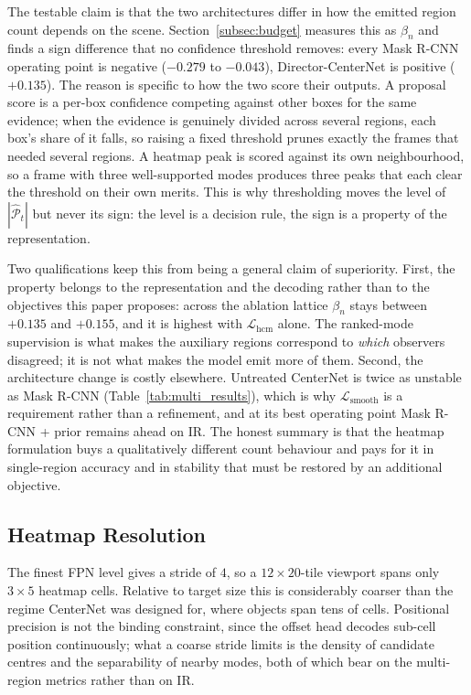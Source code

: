 \documentclass[preprint,12pt]{elsarticle}
\begin{document}
The testable claim is that the two architectures differ in how the emitted
region count depends on the scene. Section~\ref{subsec:budget} measures this as
$\beta_n$ and finds a sign difference that no confidence threshold removes:
every Mask R-CNN operating point is negative ($-0.279$ to $-0.043$),
Director-CenterNet is positive ($+0.135$). The reason is specific to how the
two score their outputs. A proposal score is a per-box confidence competing
against other boxes for the same evidence; when the evidence is genuinely
divided across several regions, each box's share of it falls, so raising a fixed
threshold prunes exactly the frames that needed several regions. A heatmap peak
is scored against its own neighbourhood, so a frame with three well-supported
modes produces three peaks that each clear the threshold on their own merits.
This is why thresholding moves the level of $|\hat{\mathcal{P}}_t|$ but never
its sign: the level is a decision rule, the sign is a property of the
representation.

Two qualifications keep this from being a general claim of superiority. First,
the property belongs to the representation and the decoding rather than to the
objectives this paper proposes: across the ablation lattice $\beta_n$ stays
between $+0.135$ and $+0.155$, and it is highest with
$\mathcal{L}_{\text{hcm}}$ alone. The ranked-mode supervision is what makes the
auxiliary regions correspond to \emph{which} observers disagreed; it is not
what makes the model emit more of them. Second, the architecture change is costly
elsewhere. Untreated CenterNet is twice as unstable as Mask R-CNN
(Table~\ref{tab:multi_results}), which is why $\mathcal{L}_{\text{smooth}}$ is
a requirement rather than a refinement, and at its best operating point
Mask R-CNN + prior remains ahead on IR. The honest summary is that the heatmap
formulation buys a qualitatively different count behaviour and pays for it in
single-region accuracy and in stability that must be restored by an additional
objective.

\subsection{Heatmap Resolution}

The finest FPN level gives a stride of $4$, so a $12 \times 20$-tile viewport
spans only $3 \times 5$ heatmap cells. Relative to target size this is
considerably coarser than the regime CenterNet was designed for, where objects
span tens of cells. Positional precision is not the binding constraint, since
the offset head decodes sub-cell position continuously; what a coarse stride
limits is the density of candidate centres and the separability of nearby
modes, both of which bear on the multi-region metrics rather than on IR.
\end{document}
